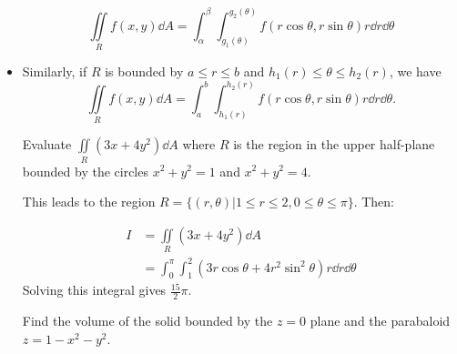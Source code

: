 \begin{itemize}
    \begin{equation}
        \iint\limits_{R} f(x,y) \dd{A} = \int_\alpha^\beta \int_{g_1(\theta)}^{g_2(\theta)}f(r\cos\theta,r\sin\theta)r\dd{r}\dd{\theta}
    \end{equation}
    \item Similarly, if $R$ is bounded by $a\le r\le b$ and $h_1(r)\le \theta \le h_2(r)$, we have 
    \begin{equation}
        \iint\limits_{R} f(x,y)\dd{A} = \int_a^b \int_{h_1(r)}^{h_2(r)}f(r\cos\theta,r\sin\theta)r\dd{r}\dd{\theta}.
    \end{equation}
    \begin{example}
        Evaluate $\iint\limits_{R} (3x+4y^2)\dd{A}$ where $R$ is the region in the upper half-plane bounded by the circles $x^2+y^2=1$ and $x^2+y^2=4$. 
        \vspace{2mm}

        This leads to the region $R=\{(r,\theta)|1\le r\le 2, 0\le \theta \le \pi\}$. Then:

        \begin{align}
            I &= \iint\limits_{R} (3x+4y^2)\dd{A} \\ 
            &= \int_0^\pi \int_1^2 (3r\cos\theta + 4r^2\sin^2 \theta)r\dd{r}\dd{\theta}
        \end{align}
        Solving this integral gives $\frac{15}{2}\pi$.
    \end{example}
    \begin{example}
        Find the volume of the solid bounded by the $z=0$ plane and the parabaloid $z=1-x^2-y^2$.
        \vspace{2mm}


\end{example}
\end{itemize}
